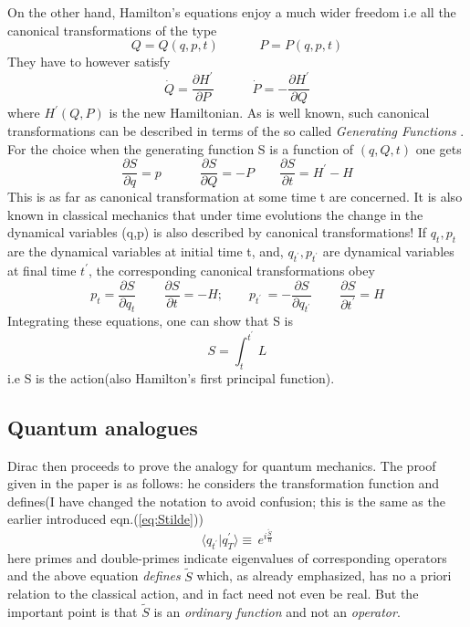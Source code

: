 \documentclass[12pt]{article}
\newcommand{\be}{\begin{equation}}
\newcommand{\ee}{\end{equation}}
\begin{document}
On the other hand, Hamilton's equations enjoy a much wider freedom i.e all the canonical transformations of the type
\be
\label{eq:canonical2}
Q = Q(q,p,t)\quad\quad\quad\,P = P(q,p,t)
\ee
They have to however satisfy
\be
\label{eq:canonical3}
{\dot Q} = \frac{\partial H^\prime}{\partial P}\quad\quad\quad{\dot P} = -\frac{\partial H^\prime}{\partial Q}
\ee
where $H^\prime(Q,P)$ is the new Hamiltonian. As is well known, such canonical transformations can be described in terms of the so called
{\it Generating Functions} \cite{landau}. For the choice when the generating function S is a function of $(q,Q,t)$ one gets
\be\label{eq: generating}
\frac{\partial S}{\partial q} = p\quad\quad\quad \frac{\partial S}{\partial Q} = - P\quad\quad \frac{\partial S}{\partial t} = H^\prime - H
\ee
This is as far as canonical transformation at some time t are concerned. It is also known in classical mechanics that under time evolutions
the change in the dynamical variables (q,p) is also described by canonical transformations! If $q_t,p_t$ are the dynamical
variables at initial time t, and, $q_{t^\prime},p_{t^\prime}$ are dynamical variables at final time $t^\prime$, the corresponding
canonical transformations obey
\be
\label{eq:canonicalevol}
p_t = \frac{\partial S}{\partial q_t}\quad\quad\,\frac{\partial S}{\partial t} = - H;\quad\quad p_{t^\prime}\,
= - \frac{\partial S}{\partial q_{t^\prime}}\quad\quad\,\frac{\partial S}{\partial t^\prime} = H
\ee
Integrating these equations, one can show that S is
\be
\label{eq:principal}
S = \int_t^{t^\prime}\,L 
\ee
i.e S is the action(also Hamilton's first principal function).

\subsection{Quantum analogues}
Dirac then proceeds to prove the analogy for quantum mechanics. The proof given in the paper \cite{diracpaper} is as follows: he considers
the transformation function and defines(I have changed the notation to avoid confusion; this is the same as the earlier introduced 
eqn.(\ref{eq:Stilde}))
\be
\label{eq:qanalog}
\langle q_{t^\prime}|q_T^{\prime}\rangle 
\equiv\, e^{i \frac{{\tilde S}}{\hbar}}
\ee
here primes and double-primes indicate eigenvalues of corresponding operators and the above equation {\it defines} ${\tilde S}$ which,
as already emphasized, has no a priori relation to the classical action, and in fact need not even be real. But the important point is 
that ${\tilde S}$ is an
\emph{ordinary function} and not an \emph{operator}.
\end{document}
